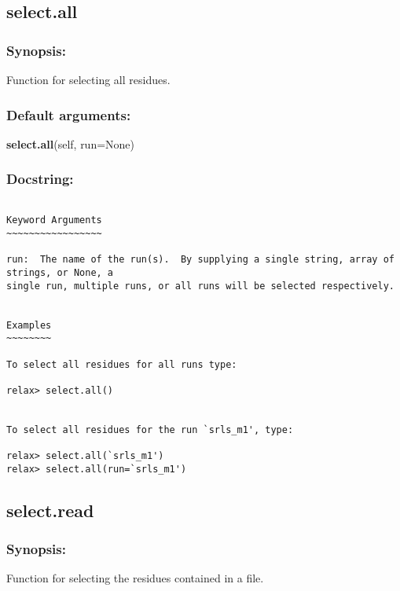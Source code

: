 \newpage

\subsection{select.all}


\subsubsection{Synopsis:}

Function for selecting all residues.

\subsubsection{Default arguments:}

\textsf{\textbf{select.all}(self, run=None)
}


\subsubsection{Docstring:}

{\scriptsize
\begin{verbatim}

Keyword Arguments
~~~~~~~~~~~~~~~~~

run:  The name of the run(s).  By supplying a single string, array of strings, or None, a
single run, multiple runs, or all runs will be selected respectively.


Examples
~~~~~~~~

To select all residues for all runs type:

relax> select.all()


To select all residues for the run `srls_m1', type:

relax> select.all(`srls_m1')
relax> select.all(run=`srls_m1')
\end{verbatim}
}



\newpage

\subsection{select.read}


\subsubsection{Synopsis:}

Function for selecting the residues contained in a file.

